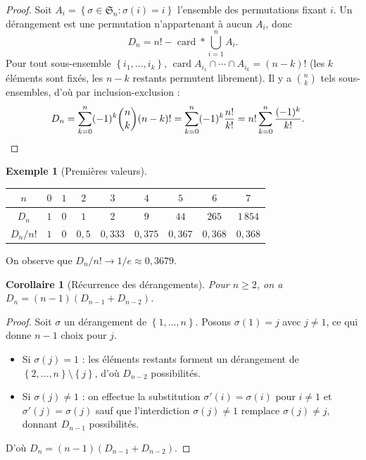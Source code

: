 \documentclass[12pt,a4paper,openany]{book}
\theoremstyle{definition}
\newtheorem{exemple}[definition]{Exemple}
\theoremstyle{plain}
\newtheorem{corollaire}[definition]{Corollaire}
\theoremstyle{remark}
\newcommand{\set}[1]{\left\{#1\right\}}
\DeclareMathOperator{\card}{card}
\begin{document}
\begin{proof}
Soit $A_i = \set{\sigma \in \mathfrak{S}_n : \sigma(i) = i}$ l'ensemble
des permutations fixant $i$. Un dérangement est une permutation
n'appartenant à aucun $A_i$, donc
\[
  D_n = n! - \card*{\bigcup_{i=1}^n A_i}.
\]
Pour tout sous-ensemble $\set{i_1, \dots, i_k}$,
$\card{A_{i_1} \cap \cdots \cap A_{i_k}} = (n-k)!$
(les $k$ éléments sont fixés, les $n-k$ restants permutent librement).
Il y a $\binom{n}{k}$ tels sous-ensembles, d'où par inclusion-exclusion :
\begin{align*}
  D_n &= \sum_{k=0}^{n} (-1)^k \binom{n}{k}(n-k)!
       = \sum_{k=0}^{n} (-1)^k \frac{n!}{k!}
       = n! \sum_{k=0}^{n} \frac{(-1)^k}{k!}. \qedhere
\end{align*}
\end{proof}

\begin{exemple}[Premières valeurs]
\label{ex:derangements-valeurs}
\begin{center}
\begin{tabular}{c|cccccccc}
\toprule
$n$ & $0$ & $1$ & $2$ & $3$ & $4$ & $5$ & $6$ & $7$ \\
\midrule
$D_n$ & $1$ & $0$ & $1$ & $2$ & $9$ & $44$ & $265$ & $1\,854$ \\
$D_n/n!$ & $1$ & $0$ & $0{,}5$ & $0{,}333$ & $0{,}375$ & $0{,}367$ & $0{,}368$ & $0{,}368$ \\
\bottomrule
\end{tabular}
\end{center}
On observe que $D_n / n! \to 1/e \approx 0{,}3679$.
\end{exemple}

\begin{corollaire}[Récurrence des dérangements]
\label{cor:derangement-rec}
Pour $n \geqslant 2$, on a $D_n = (n-1)(D_{n-1} + D_{n-2})$.
\end{corollaire}

\begin{proof}
Soit $\sigma$ un dérangement de $\set{1, \dots, n}$. Posons $\sigma(1) = j$
avec $j \neq 1$, ce qui donne $n-1$ choix pour $j$.
\begin{itemize}[nosep]
  \item Si $\sigma(j) = 1$ : les éléments restants forment un dérangement
    de $\set{2, \dots, n} \setminus \set{j}$, d'où $D_{n-2}$ possibilités.
  \item Si $\sigma(j) \neq 1$ : on effectue la substitution $\sigma'(i) = \sigma(i)$
    pour $i \neq 1$ et $\sigma'(j) = \sigma(j)$ sauf que l'interdiction
    $\sigma(j) \neq 1$ remplace $\sigma(j) \neq j$, donnant $D_{n-1}$ possibilités.
\end{itemize}
D'où $D_n = (n-1)(D_{n-1} + D_{n-2})$.
\end{proof}
\end{document}
